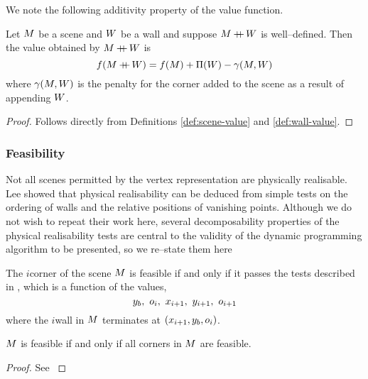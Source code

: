 We note the following additivity property of the value function.

\begin{lemma}
  \label{lemma:additive-values}
  Let $\Scene$ be a scene and $\Wall$ be a wall and suppose
  $\Scene\concat\Wall$ is well--defined. Then the value obtained by
  $\Scene\concat\Wall$ is
  \begin{equation}
    \Objective(\Scene\concat\Wall) = 
      \Objective(\Scene) + \WallPayoff(\Wall) - 
      \CornerPenalty(\Scene,\Wall)
  \end{equation}
  where $\CornerPenalty(\Scene,\Wall)$ is the penalty
  for the corner added to the scene as a result of appending $\Wall$.
\end{lemma}
\begin{proof}
  Follows directly from Definitions \ref{def:scene-value} and
  \ref{def:wall-value}.
\end{proof}

\subsubsection{Feasibility}

Not all scenes permitted by the vertex representation are physically
realisable. Lee \etal \cite{Lee09} showed that physical realisability
can be deduced from simple tests on the ordering of walls and the
relative positions of vanishing points. Although we do not wish to
repeat their work here, several decomposability properties of the
physical realisability tests are central to the validity of the
dynamic programming algorithm to be presented, so we re--state them
here

\begin{definition}
  \label{def:feasible-corners}
  The $i$\th corner of the scene $\Scene$ is feasible if and only if
  it passes the tests described in \cite{Lee09}, which is a
  function of the values,
  \begin{equation}
    y_b,~\WallOrient_i,~x_{i+1},~y_{i+1},~\WallOrient_{i+1}
  \end{equation}
  where the $i$\th wall in $\Scene$ terminates at
  $(x_{i+1},y_b,\WallOrient_i)$.
\end{definition}

\begin{lemma}
  \label{def:feasible-scenes}
  $\Scene$ is feasible if and only if all corners in $\Scene$ are feasible.
\end{lemma}
\begin{proof}
  See \cite{Lee09}
\end{proof}

